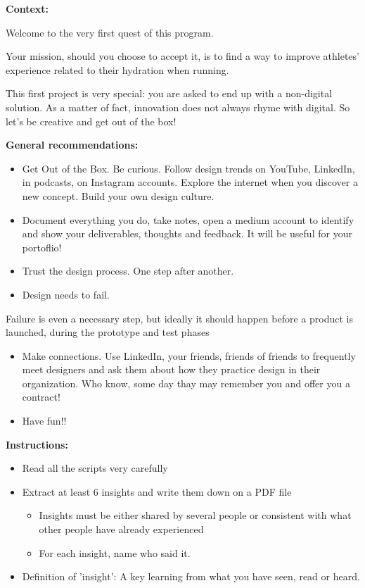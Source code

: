 \makeheaderfiles

\textbf{Context:}

Welcome to the very first quest of this program.

Your mission, should you choose to accept it, is to find a way to improve athletes' experience related to their hydration when running.

This first project is very special: you are asked to end up with a non-digital solution. As a matter of fact, innovation does not always rhyme with digital. So let's be creative and get out of the box!

\textbf{General recommendations:}

\begin{itemize}
\item Get Out of the Box. Be curious. Follow design trends on YouTube, LinkedIn, in podcasts, on Instagram accounts. Explore the internet when you discover a new concept. Build your own design culture.
\item Document everything you do, take notes, open a medium account to identify and show your deliverables, thoughts and feedback. It will be useful for your portoflio!
\item Trust the design process. One step after another.
\item Design needs to fail. 
\end{itemize}
Failure is even a necessary step, but ideally it should happen before a product is launched, during the prototype and test phases
\begin{itemize}
\item Make connections. Use LinkedIn, your friends, friends of friends to frequently meet designers and ask them about how they practice design in their organization. Who know, some day thay may remember you and offer you a contract!
\item Have fun!!
\end{itemize}

\textbf{Instructions:}

\begin{itemize}
\item Read all the scripts very carefully
\item Extract at least 6 insights and write them down on a PDF file
\begin{itemize}
\item Insights must be either shared by several people or consistent with what other people have already experienced
\item For each insight, name who said it.
\end{itemize}
\item Definition of 'insight': A key learning from what you have seen, read or heard. 
\end{itemize}

